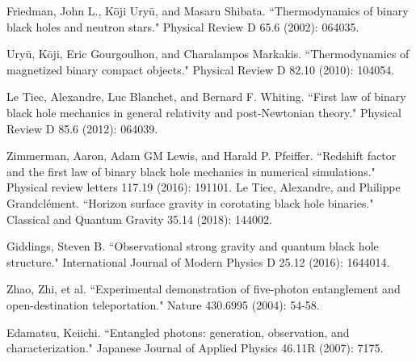 \documentclass[fleqn,usenatbib]{mnras}
\begin{document}
\begin{thebibliography}{99}
Friedman, John L., Kōji Uryū, and Masaru Shibata. ``Thermodynamics of binary black holes and neutron stars." Physical Review D 65.6 (2002): 064035.

Uryū, Kōji, Eric Gourgoulhon, and Charalampos Markakis. ``Thermodynamics of magnetized binary compact objects." Physical Review D 82.10 (2010): 104054.

Le Tiec, Alexandre, Luc Blanchet, and Bernard F. Whiting. ``First law of binary black hole mechanics in general relativity and post-Newtonian theory." Physical Review D 85.6 (2012): 064039.

Zimmerman, Aaron, Adam GM Lewis, and Harald P. Pfeiffer. ``Redshift factor and the first law of binary black hole mechanics in numerical simulations." Physical review letters 117.19 (2016): 191101.
Le Tiec, Alexandre, and Philippe Grandclément. ``Horizon surface gravity in corotating black hole binaries." Classical and Quantum Gravity 35.14 (2018): 144002.

Giddings, Steven B. ``Observational strong gravity and quantum black hole structure." International Journal of Modern Physics D 25.12 (2016): 1644014.

Zhao, Zhi, et al. ``Experimental demonstration of five-photon entanglement and open-destination teleportation." Nature 430.6995 (2004): 54-58.


Edamatsu, Keiichi. ``Entangled photons: generation, observation, and characterization." Japanese Journal of Applied Physics 46.11R (2007): 7175.

\end{thebibliography}
\appendix






\bsp	%
\label{lastpage}
\end{document}
